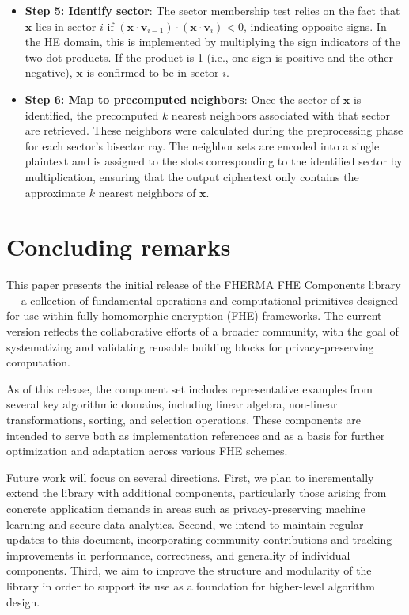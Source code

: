 \documentclass[article]{iacrtrans}
\begin{document}
\begin{itemize}
    \item \textbf{Step 5: Identify sector}: The sector membership test relies on the fact that $\mathbf{x}$ lies in sector $i$ if $(\mathbf{x} \cdot \mathbf{v}_{i-1}) \cdot (\mathbf{x} \cdot \mathbf{v}_i) < 0$, indicating opposite signs. In the HE domain, this is implemented by multiplying the sign indicators of the two dot products. If the product is 1 (i.e., one sign is positive and the other negative), $\mathbf{x}$ is confirmed to be in sector $i$.
    \item \textbf{Step 6: Map to precomputed neighbors}: Once the sector of $\mathbf{x}$ is identified, the precomputed $k$ nearest neighbors associated with that sector are retrieved. These neighbors were calculated during the preprocessing phase for each sector's bisector ray. The neighbor sets are encoded into a single plaintext and is assigned to the slots corresponding to the identified sector by multiplication, ensuring that the output ciphertext only contains the approximate $k$ nearest neighbors of $\mathbf{x}$.
\end{itemize}

\section{Concluding remarks}

This paper presents the initial release of the FHERMA FHE Components library — a collection of fundamental operations and computational primitives designed for use within fully homomorphic encryption (FHE) frameworks. The current version reflects the collaborative efforts of a broader community, with the goal of systematizing and validating reusable building blocks for privacy-preserving computation.

As of this release, the component set includes representative examples from several key algorithmic domains, including linear algebra, non-linear transformations, sorting, and selection operations. These components are intended to serve both as implementation references and as a basis for further optimization and adaptation across various FHE schemes.

Future work will focus on several directions. First, we plan to incrementally extend the library with additional components, particularly those arising from concrete application demands in areas such as privacy-preserving machine learning and secure data analytics. Second, we intend to maintain regular updates to this document, incorporating community contributions and tracking improvements in performance, correctness, and generality of individual components. Third, we aim to improve the structure and modularity of the library in order to support its use as a foundation for higher-level algorithm design.
\end{document}
